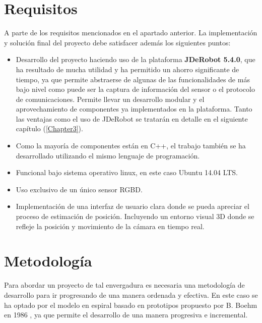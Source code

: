 \section{Requisitos}

A parte de los requisitos mencionados en el apartado anterior. La implementación y solución final del proyecto debe satisfacer además los siguientes puntos:

\begin{itemize}

\item Desarrollo del proyecto haciendo uso de la plataforma \textbf{JDeRobot 5.4.0}, que ha resultado de mucha utilidad y ha permitido un ahorro significante de tiempo, ya que permite abstraerse de algunas de las funcionalidades de más bajo nivel como puede ser la captura de información del sensor o el protocolo de comunicaciones. Permite llevar un desarrollo modular y el aprovechamiento de componentes ya implementados en la plataforma. Tanto las ventajas como el uso de JDeRobot se tratarán en detalle en el siguiente capítulo  (\ref{Chapter3}).

\item Como la mayoría de componentes están en C++, el trabajo también se ha desarrollado utilizando el mismo lenguaje de programación. 

\item Funcional bajo sistema operativo linux, en este caso Ubuntu 14.04 LTS.

\item Uso exclusivo de un único sensor RGBD.

\item Implementación de una interfaz de usuario clara donde se pueda apreciar el proceso de estimación de posición. Incluyendo un entorno visual 3D donde se refleje la posición y movimiento de la cámara en tiempo real.

\end{itemize}


\section{Metodología}

Para abordar un proyecto de tal envergadura es necesaria una metodología de desarrollo para ir progresando de una manera ordenada y efectiva. En este caso se ha optado por el modelo en espiral basado en prototipos propuesto por B. Boehm en 1986 \parencite{Reference7}, ya que permite el desarrollo de una manera progresiva e incremental. 

